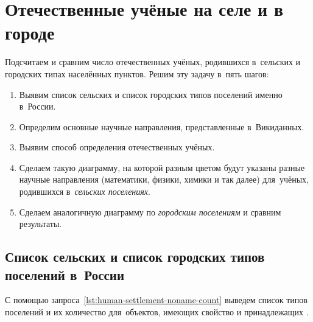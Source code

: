 \section{Отечественные учёные на селе и в городе}

Подсчитаем и сравним число отечественных учёных, родившихся в~сельских и городских типах населённых пунктов. 
Решим эту задачу в~пять шагов:
\begin{enumerate}
  \item Выявим список сельских и список городских типов поселений именно в~России.
  \item Определим основные научные направления, представленные в~Викиданных.
  \item Выявим способ определения отечественных учёных.
  \item Сделаем такую диаграмму, на которой разным цветом будут указаны разные научные направления (математики, физики, химики и так далее) для~учёных, родившихся в~\emph{сельских поселениях}.
  \item Сделаем аналогичную диаграмму по \emph{городским поселениям} и сравним результаты.
\end{enumerate}




\newpage
\subsection{Список сельских и список городских типов поселений в~России}%
\label{sec:list-village-city-types-in-Russia}

С помощью запроса~\ref{lst:human-settlement-noname-count} 
выведем список типов поселений и их количество для~объектов, 
имеющих свойство  
и принадлежащих . 

